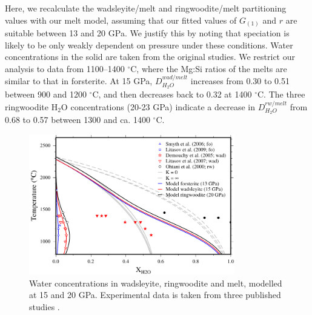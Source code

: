 \documentclass[review]{elsarticle}
\begin{document}
Here, we recalculate the wadsleyite/melt and ringwoodite/melt partitioning values with our melt model, assuming that our fitted values of $G_{(1)}$ and $r$ are suitable between 13 and 20 GPa. We justify this by noting that speciation is likely to be only weakly dependent on pressure under these conditions. Water concentrations in the solid are taken from the original studies. We restrict our analysis to data from 1100--1400 $^{\circ}$C, where the Mg:Si ratios of the melts are similar to that in forsterite. At 15 GPa, $D^{wad/melt}_{H_2O}$ increases from 0.30 to 0.51 between 900 and 1200 $^{\circ}$C, and then decreases back to 0.32 at 1400 $^{\circ}$C. The three ringwoodite H$_2$O concentrations (20-23 GPa) indicate a decrease in $D^{rw/melt}_{H_2O}$ from 0.68 to 0.57 between 1300 and ca. 1400 $^{\circ}$C.

\begin{figure}[ht!]
  \centering
      \includegraphics[width=0.8\textwidth]{figures/fo_wad_rw}
  \caption{Water concentrations in wadsleyite, ringwoodite and melt, modelled at 15 and 20 GPa. Experimental data is taken from three published studies \citep{OMY2000,DDFK2005,LSOK2011}.}
  \label{fig:fo_wad_rw_melt}
\end{figure}
\end{document}
